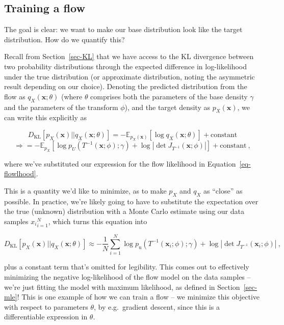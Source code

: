 \documentclass[
  11pt,
  numbers=noendperiod]{book}
\begin{document}
\hypertarget{sec-trainflow}{%
\subsection{Training a flow}\label{sec-trainflow}}

The goal is clear: we want to make our base distribution look like the
target distribution. How do we quantify this?

Recall from Section~\ref{sec-KL} that we have access to the
KL divergence between two probability distributions through the expected
difference in log-likelihood under the true distribution (or approximate
distribution, noting the asymmetric result depending on our choice).
Denoting the predicted distribution from the flow as
\(q_X(\mathbf{x}; \theta)\) (where \(\theta\) comprises both the
parameters of the base density \(\gamma\) and the parameters of the
transform \(\phi\)), and the target density as \(p_X(\mathbf{x})\), we
can write this explicitly as

\[
D_{\mathrm{KL}}[p_X(\mathbf{x}) || q_X(\mathbf{x}; \theta)] = -\mathbb{E}_{p_X(\mathbf{x})}\left[\log q_X(\mathbf{x}; \theta)\right] + \mathrm{constant}
\] \[
\Rightarrow = -\mathbb{E}_{p_X}\left[\log p_U(T^{-1}(\mathbf{x} ;\phi); \gamma) + \log |\det J_{T^{-1}}(\mathbf{x}; \phi)|\right] + \mathrm{constant}~,
\]

where we've substituted our expression for the flow likelihood in
Equation~\ref{eq-flowlhood}.

This is a quantity we'd like to minimize, as to make \(p_X\) and \(q_X\)
as ``close'' as possible. In practice, we're likely going to have to
substitute the expectation over the true (unknown) distribution with a
Monte Carlo estimate using our data samples \({x_i}_{i=1}^{N}\), which
turns this equation into

\[D_{\mathrm{KL}}[p_X(\mathbf{x}) || q_X(\mathbf{x}; \theta)] \approx-\frac{1}{N} \sum_{i=1}^N \log p_{\mathrm{u}}\left(T^{-1}\left(\mathbf{x}_i ; {\phi}\right) ; \gamma\right)+\log \left|\operatorname{det} J_{T^{-1}}\left(\mathbf{x}_i ; {\phi}\right)\right|~,\]

plus a constant term that's omitted for legibility. This comes out to effectively minimizing the negative log-likelihood of
the flow model on the data samples -- we're just fitting the model with
maximum likelihood, as defined in Section~\ref{sec-mle}! This is one
example of how we can train a flow -- we minimize this objective with
respect to parameters \(\theta\), by e.g.~gradient descent, since this
is a differentiable expression in \(\theta\).
\end{document}
